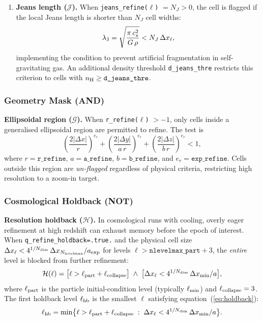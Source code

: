\documentclass[fleqn,usenatbib]{mnras}
\newcommand{\lJ}{\lambda_{\rm J}}
\newcommand{\dx}{\Delta x}
\newcommand{\nlevelmax}{N_{\rm levelmax}}
\newcommand{\code}[1]{\texttt{#1}}
\begin{document}
\begin{enumerate}
\item \textbf{Jeans length ($\mathcal{J}$).}
  When \code{jeans\_refine($\ell$)} $= N_J > 0$, the cell is flagged if
  the local Jeans length is shorter than $N_J$ cell widths:
  \begin{equation}
    \lJ = \sqrt{\frac{\pi\,c_s^2}{G\,\rho}}
    < N_J\,\dx_\ell,
    \label{eq:jeans_crit}
  \end{equation}
  implementing the \citet{Truelove1997} condition to prevent artificial
  fragmentation in self-gravitating gas.  An additional density
  threshold \code{d\_jeans\_thre} restricts this criterion to cells
  with $n_{\rm H} \ge \code{d\_jeans\_thre}$.

\end{enumerate}

\subsubsection{Geometry Mask (AND)}

\textbf{Ellipsoidal region ($\mathcal{G}$).}
When \code{r\_refine($\ell$)} $> -1$, only cells inside a generalised
ellipsoidal region are permitted to refine.  The test is
\begin{equation}
  \left(
    \frac{2|\Delta x|}{r}
  \right)^{e_r}
  + \left(
    \frac{2|\Delta y|}{a\,r}
  \right)^{e_r}
  + \left(
    \frac{2|\Delta z|}{b\,r}
  \right)^{e_r}
  < 1,
\end{equation}
where $r = \code{r\_refine}$, $a = \code{a\_refine}$,
$b = \code{b\_refine}$, and $e_r = \code{exp\_refine}$.
Cells outside this region are \emph{un-flagged} regardless of
physical criteria, restricting high resolution to a zoom-in target.

\subsubsection{Cosmological Holdback (NOT)}

\textbf{Resolution holdback ($\mathcal{H}$).}
In cosmological runs with cooling, overly eager refinement at high
redshift can exhaust memory before the epoch of interest.
When \code{q\_refine\_holdback=.true.} and the physical cell size
$\dx_\ell < 4^{1/N_{\rm dim}}\,\dx_{\nlevelmax}/a_{\rm exp}$
for levels $\ell > \code{nlevelmax\_part} + 3$, the \emph{entire}
level is blocked from further refinement:
\begin{equation}
  \mathcal{H}(\ell) = \bigl[\ell > \ell_{\rm part} + \ell_{\rm collapse}\bigr]
  \;\wedge\;
  \bigl[\dx_\ell < 4^{1/N_{\rm dim}}\,\dx_{\rm min}/a\bigr],
  \label{eq:holdback}
\end{equation}
where $\ell_{\rm part}$ is the particle initial-condition level
(typically $\ell_{\rm min}$) and $\ell_{\rm collapse}=3$.
The first holdback level $\ell_{\rm hb}$ is the smallest $\ell$
satisfying equation~(\ref{eq:holdback}):
\begin{equation}
  \ell_{\rm hb} = \min\bigl\{\ell > \ell_{\rm part}+\ell_{\rm collapse}
  \;:\; \dx_\ell < 4^{1/N_{\rm dim}}\,\dx_{\rm min}/a\bigr\}.
  \label{eq:lhb}
\end{equation}
\end{document}
